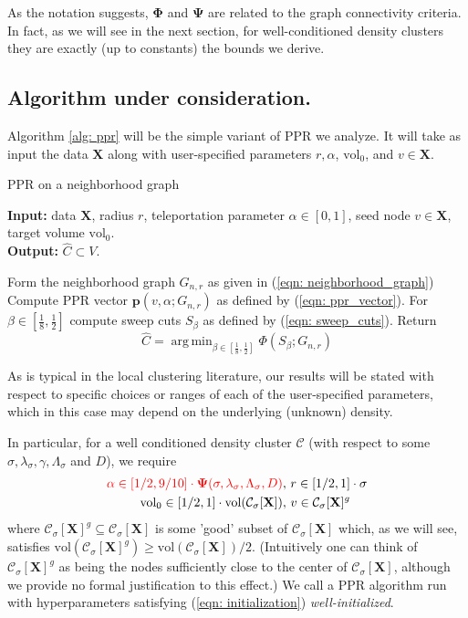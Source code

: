 \documentclass{article}
\newcommand{\vol}{\mathrm{vol}}
\newcommand{\1}{\mathbf{1}}
\newcommand{\Phibf}{\mathbf{\Phi}}
\newcommand{\Psibf}{\mathbf{\Psi}}
\newcommand{\pbf}{\mathbf{p}}
\newcommand{\Xbf}{\mathbf{X}}
\newcommand{\Cset}{\mathcal{C}}
\newcommand{\Csig}{\Cset_{\sigma}}
\DeclareMathOperator*{\argmin}{arg\,min}
\theoremstyle{aldenthm}
\theoremstyle{remark}
\begin{document}
As the notation suggests, $\Phibf$ and $\Psibf$ are related to the graph connectivity criteria. In fact, as we will see in the next section, for well-conditioned density clusters they are exactly (up to constants) the bounds we derive.

\subsection{Algorithm under consideration.}

Algorithm \ref{alg: ppr} will be the simple variant of PPR we analyze. It will take as input the data $\Xbf$ along with user-specified parameters $r, \alpha$, $\vol_0$, and $v \in \Xbf$.

\begin{algorithm}
	\caption{PPR on a neighborhood graph}
	\label{alg: ppr}	
	{\bfseries Input:} data $\Xbf$, radius $r$, teleportation parameter $\alpha \in [0,1]$, seed node $v \in \Xbf$, target volume $\vol_0$. \\
	{\bfseries Output:} $\widehat{C} \subset V$.
	\begin{algorithmic}[1]
		\STATE Form the neighborhood graph $G_{n,r}$ as given in (\ref{eqn: neighborhood_graph})
		\STATE Compute PPR vector $\pbf(v, \alpha; G_{n,r})$  as defined by (\ref{eqn: ppr_vector}).
		\STATE For $\beta \in [\frac{1}{8}, \frac{1}{2}]$ compute sweep cuts $S_{\beta}$ as defined by (\ref{eqn: sweep_cuts}).
		\STATE Return
		\begin{equation*}
		\label{eqn: sweep_cuts_min_conductance}
		\widehat{C} = \argmin_{\beta \in [\frac{1}{8}, \frac{1}{2}]} \Phi(S_{\beta}; G_{n,r})
		\end{equation*}
	\end{algorithmic}
\end{algorithm}

As is typical in the local clustering literature, our results will be stated with respect to specific choices or ranges of each of the user-specified parameters, which in this case may depend on the underlying (unknown) density. 

In particular, for a well conditioned density cluster $\Cset$ (with respect to some $\sigma, \lambda_{\sigma}, \gamma, \Lambda_{\sigma}$ and $D$), we require
\begin{align}
\label{eqn: initialization}
\textcolor{red}{\alpha \in [1/2, 9/10] \cdot \mathbf{\Psi}(\sigma, \lambda_{\sigma}, \Lambda_{\sigma}, D)}, & ~r \in [1/2,1]\cdot\sigma  \nonumber \\
\vol_0 \in [1/2,1]\cdot\vol(\Csig[\Xbf]), & ~v \in \Csig[\Xbf]^g
\end{align}
where $\Csig[\Xbf]^g \subseteq \Csig[\Xbf]$ is some 'good' subset of $\Csig[\Xbf]$ which, as we will see, satisfies $\vol(\Csig[\Xbf]^g) \geq \vol(\Csig[\Xbf])/2$. (Intuitively one can think of $\Csig[\Xbf]^g$ as being the nodes sufficiently close to the center of $\Csig[\Xbf]$, although we provide no formal justification to this effect.) We call a PPR algorithm run with hyperparameters satisfying (\ref{eqn: initialization}) \emph{well-initialized}.
\end{document}
